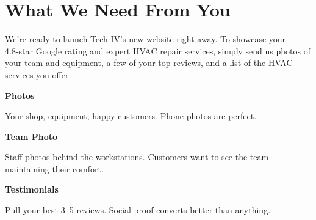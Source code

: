 \documentclass[11pt,letterpaper]{article}
\begin{document}
\vspace{0.2em}

\section*{What We Need From You}

We're ready to launch Tech IV’s new website right away. To showcase your 4.8‑star Google rating and expert HVAC repair services, simply send us photos of your team and equipment, a few of your top reviews, and a list of the HVAC services you offer.

\vspace{0.12em}

\noindent\begin{minipage}[t]{0.48\textwidth}
\begin{tcolorbox}[colframe=accent-teal, boxrule=1pt, left=0.7em, right=0.7em, top=0.5em, bottom=0.5em, arc=4pt, boxsep=0pt]
{\bfseries\small\color{accent-teal}Photos}

\vspace{0.15em}

{\small Your shop, equipment, happy customers. Phone photos are perfect.}
\end{tcolorbox}

\vspace{0.1em}

\begin{tcolorbox}[colframe=accent-teal, boxrule=1pt, left=0.7em, right=0.7em, top=0.5em, bottom=0.5em, arc=4pt, boxsep=0pt]
{\bfseries\small\color{accent-teal}Team Photo}

\vspace{0.15em}

{\small Staff photos behind the workstations. Customers want to see the team maintaining their comfort.}
\end{tcolorbox}

\vspace{0.1em}

\begin{tcolorbox}[colframe=accent-teal, boxrule=1pt, left=0.7em, right=0.7em, top=0.5em, bottom=0.5em, arc=4pt, boxsep=0pt]
{\bfseries\small\color{accent-teal}Testimonials}

\vspace{0.15em}

{\small Pull your best 3--5 reviews. Social proof converts better than anything.}
\end{tcolorbox}
\end{minipage}
\end{document}
